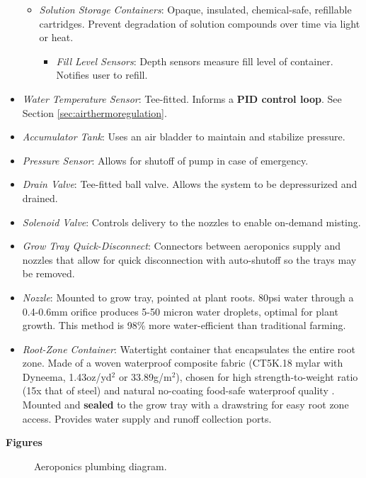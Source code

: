 \begin{itemize}
\begin{itemize}
        \item \textit{Solution Storage Containers}: Opaque, insulated, chemical-safe, refillable cartridges. Prevent degradation of solution compounds over time via light or heat.
        \begin{itemize}
            \item \textit{Fill Level Sensors}: Depth sensors measure fill level of container. Notifies user to refill.
        \end{itemize}
    \end{itemize}
    \item \textit{Water Temperature Sensor}: Tee-fitted. Informs a \textbf{PID control loop}. See Section \ref{sec:airthermoregulation}.
    \item \textit{Accumulator Tank}: Uses an air bladder to maintain and stabilize pressure.
    \item \textit{Pressure Sensor}: Allows for shutoff of pump in case of emergency.
    \item \textit{Drain Valve}: Tee-fitted ball valve. Allows the system to be depressurized and drained.
    \item \textit{Solenoid Valve}: Controls delivery to the nozzles to enable on-demand misting.
    \item \textit{Grow Tray Quick-Disconnect}: Connectors between aeroponics supply and nozzles that allow for quick disconnection with auto-shutoff so the trays may be removed.
    \item \textit{Nozzle}: Mounted to grow tray, pointed at plant roots. 80psi water through a 0.4-0.6mm orifice produces 5-50 micron water droplets, optimal for plant growth. This method is 98\% more water-efficient than traditional farming.%
    \item \textit{Root-Zone Container}: Watertight container that encapsulates the entire root zone. Made of a woven waterproof composite fabric (CT5K.18 mylar with Dyneema, 1.43oz/yd${}^2$ or 33.89g/m${}^2$), chosen for high strength-to-weight ratio (15x that of steel) and natural no-coating food-safe waterproof quality \cite{dyneema}. Mounted and \textbf{sealed} to the grow tray with a drawstring for easy root zone access. Provides water supply and runoff collection ports.
\end{itemize}

\textbf{Figures}

\begin{figure}[h!]
    \centering
    \caption{Aeroponics plumbing diagram.}
    \label{fig:aeroponics_plumbing}
\end{figure}

